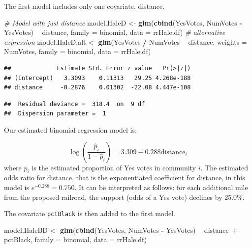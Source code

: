 \documentclass[
]{krantz}
\newenvironment{Shaded}{\begin{snugshade}}{\end{snugshade}}
\newcommand{\CommentTok}[1]{\textcolor[rgb]{0.37,0.37,0.37}{\textit{#1}}}
\newcommand{\DataTypeTok}[1]{\textcolor[rgb]{0.27,0.27,0.27}{#1}}
\newcommand{\KeywordTok}[1]{\textcolor[rgb]{0.27,0.27,0.27}{\textbf{#1}}}
\newcommand{\NormalTok}[1]{#1}
\newcommand{\OperatorTok}[1]{\textcolor[rgb]{0.43,0.43,0.43}{\textbf{#1}}}
\newcommand{\StringTok}[1]{\textcolor[rgb]{0.5,0.5,0.5}{#1}}
\begin{document}
The first model includes only one covariate, distance.

\begin{Shaded}
\begin{Highlighting}[]
\CommentTok{# Model with just distance}
\NormalTok{model.HaleD <-}\StringTok{ }\KeywordTok{glm}\NormalTok{(}\KeywordTok{cbind}\NormalTok{(YesVotes, NumVotes }\OperatorTok{-}\StringTok{ }\NormalTok{YesVotes) }\OperatorTok{~}
\StringTok{    }\NormalTok{distance, }\DataTypeTok{family =}\NormalTok{ binomial, }\DataTypeTok{data =}\NormalTok{ rrHale.df)}
\CommentTok{# alternative expression}
\NormalTok{model.HaleD.alt <-}\StringTok{ }\KeywordTok{glm}\NormalTok{(YesVotes }\OperatorTok{/}\StringTok{ }\NormalTok{NumVotes }\OperatorTok{~}\StringTok{ }\NormalTok{distance, }
    \DataTypeTok{weights =}\NormalTok{ NumVotes, }\DataTypeTok{family =}\NormalTok{ binomial, }\DataTypeTok{data =}\NormalTok{ rrHale.df)}
\end{Highlighting}
\end{Shaded}

\begin{verbatim}
##             Estimate Std. Error z value   Pr(>|z|)
## (Intercept)   3.3093    0.11313   29.25 4.268e-188
## distance     -0.2876    0.01302  -22.08 4.447e-108
\end{verbatim}

\begin{verbatim}
##  Residual deviance =  318.4  on  9 df 
##  Dispersion parameter =  1
\end{verbatim}

Our estimated binomial regression model is:

\[\log\left(\frac{\hat{p}_i}{1-\hat{p}_i}\right)=3.309-0.288 \textrm{distance}_i\]
where \(\hat{p}_i\) is the estimated proportion of Yes votes in community \(i\). The estimated odds ratio for distance, that is the exponentiated coefficient for distance, in this model is \(e^{-0.288}=0.750\). It can be interpreted as follows: for each additional mile from the proposed railroad, the support (odds of a Yes vote) declines by 25.0\%.

The covariate \texttt{pctBlack} is then added to the first model.

\begin{Shaded}
\begin{Highlighting}[]
\NormalTok{model.HaleBD <-}\StringTok{ }\KeywordTok{glm}\NormalTok{(}\KeywordTok{cbind}\NormalTok{(YesVotes, NumVotes }\OperatorTok{-}\StringTok{ }\NormalTok{YesVotes) }\OperatorTok{~}
\StringTok{  }\NormalTok{distance }\OperatorTok{+}\StringTok{ }\NormalTok{pctBlack, }\DataTypeTok{family =}\NormalTok{ binomial, }\DataTypeTok{data =}\NormalTok{ rrHale.df)}
\end{Highlighting}
\end{Shaded}
\end{document}
